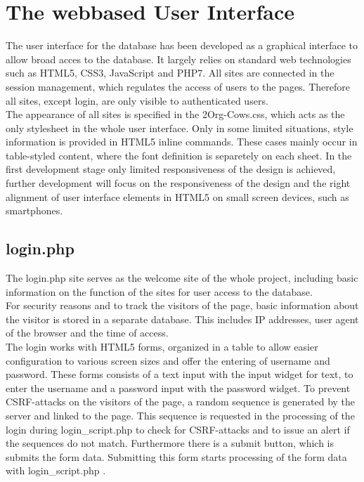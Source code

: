 
\section{The webbased User Interface}
The user interface for the database has been developed as a graphical interface to allow broad acces to the database. It largely relies on standard web technologies such as HTML5, CSS3, 
JavaScript and PHP7. All sites are connected in the session management, which regulates the access of users to the pages. Therefore all sites, except login, are only visible to 
authenticated users.\\
The appearance of all sites is specified in the 2Org-Cows.css, which acts as the only stylesheet in the whole user interface. Only in some limited situations, style information is provided
in HTML5 inline commands. These cases mainly occur in table-styled content, where the font definition is separetely on each sheet.  In the first development stage only limited responsiveness of the design is achieved, further development will focus on the responsiveness of the design
and the right alignment of user interface elements in HTML5 on small screen devices, such as smartphones.


\subsection{login.php}
The login.php site serves as the welcome site of the whole project, including basic information on the function of the sites for user access to the database.\\
For security reasons and to track the visitors of the page, basic information about the visitor is stored in a separate database. This includes IP addresses, user agent of 
the browser and the time of access. \\
The login works with HTML5 forms, organized in a table to allow easier configuration to various screen sizes and offer the entering of username and password. 
These forms consists of a text input with the input widget for text, to enter the username and a password input with the 
password widget. To prevent CSRF-attacks on the visitors of the page, a random sequence is generated by the server and linked to the page. This sequence is requested in the 
processing of the login during login\_script.php to check for CSRF-attacks and to issue an alert if the sequences do not match. 
Furthermore there is a submit button, which is submits the form data. Submitting this form starts processing of the form data with login\_script.php .

